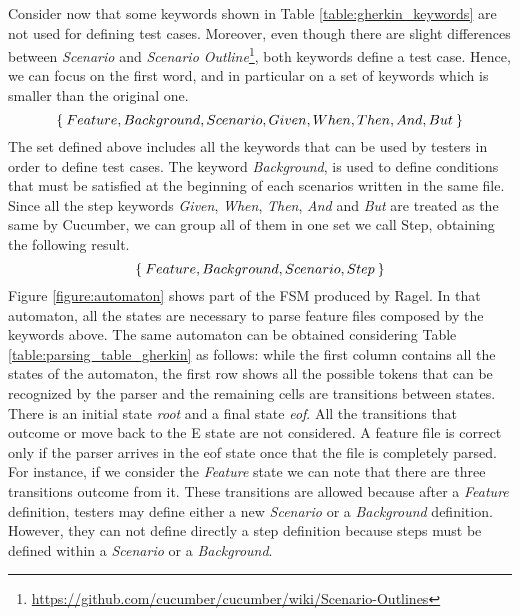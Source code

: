 Consider now that some keywords shown in Table \ref{table:gherkin_keywords} are not used for defining test cases. Moreover, even though there are slight differences between \textit{Scenario} and \textit{Scenario Outline}\footnote{\url{https://github.com/cucumber/cucumber/wiki/Scenario-Outlines}}, both keywords define a test case. Hence, we can focus on the first word, and in particular on a set of keywords which is smaller than the original one.
\[
\Set{Feature, Background, Scenario, Given, When, Then, And, But}
\]
The set defined above includes all the keywords that can be used by testers in order to define test cases. The keyword \textit{Background}, is used to define conditions that must be satisfied at the beginning of each scenarios written in the same file. Since all the step keywords \textit{Given}, \textit{When}, \textit{Then}, \textit{And} and \textit{But} are treated as the same by Cucumber, we can group all of them in one set we call Step, obtaining the following result.
\[
\Set{Feature, Background, Scenario, Step}
\]
Figure \ref{figure:automaton} shows part of the FSM produced by Ragel. In that automaton, all the states are necessary to parse feature files composed by the keywords above. The same automaton can be obtained considering Table \ref{table:parsing_table_gherkin} as follows: while the first column contains all the states of the automaton, the first row shows all the possible tokens that can be recognized by the parser and the remaining cells are transitions between states. There is an initial state \textit{root} and a final state \textit{eof}. All the transitions that outcome or move back to the E state are not considered.
A feature file is correct only if the parser arrives in the eof state once that the file is completely parsed. For instance, if we consider the \textit{Feature} state we can note that there are three transitions outcome from it. These transitions are allowed because after a \textit{Feature} definition, testers may define either a new \textit{Scenario} or a \textit{Background} definition. However, they can not define directly a step definition because steps must be defined within a \textit{Scenario} or a \textit{Background}.

